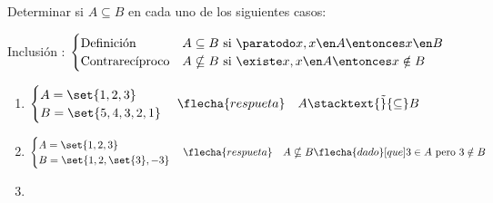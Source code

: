 \ejercicio
Determinar si $A \subseteq B$ en cada uno de los siguientes casos:

\separadorCorto

Inclusión :
$
	\begin{cases}
		\text{Definición}      & A \subseteq B \text{ si } \paratodo x, x \en A \entonces x \en B   \\
		\text{Contrarecíproco} & A \nsubseteq B \text{ si } \existe x, x \en A \entonces x \notin B
	\end{cases}
$
\begin{enumerate}[label=(\roman*)]
	\item $\begin{cases}
			      A = \set{1, 2, 3} \\
			      B = \set{5,4,3,2,1}
		      \end{cases}
		      \flecha{respueta} \quad
		      A \stacktext{\Tilde}{\subseteq} B$
	\item $\begin{cases}
			      A = \set{1, 2, 3} \\
			      B = \set{1,2,\set{3},-3}
		      \end{cases}
		      \flecha{respueta} \quad
		      A \nsubseteq B \flecha{dado}[que] 3 \in A \text{ pero } 3 \notin B$
	\item
	      \def\tresiiiUno{
		      \begin{tikzpicture}[scale=0.8, baseline=0]
			      \draw[thick, <->,] (-3.5,0) -- (3.5,0);
			      \draw[fill=white] (2,0) circle (2pt);
			      \draw[fill=white] (3,0) circle (2pt);
			      \draw[fill=white] (-2,0) circle (2pt);
			      \draw[fill=white] (-3,0) circle (2pt);
			      \draw[-, magenta, ultra thick] (2,0) -- (3,0);
			      \draw[-, magenta, ultra thick] (-2,0) -- (-3,0);
			      \node at (2,-0.3) {2};
			      \node at (3,-0.3) {3};
			      \node at (-2,-0.3) {-2};
			      \node at (-3,-0.3) {-3};
		      \end{tikzpicture}
	      }


\end{enumerate}
